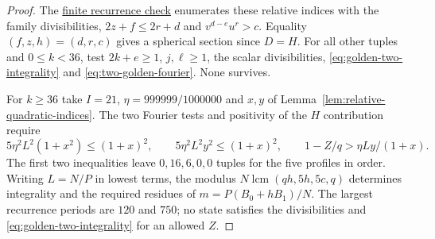 \documentclass[11pt,reqno]{amsart}
\newcommand{\codecheck}[2]{\href{https://github.com/sebastienpalcoux/grothendieck-ring-classification/blob/d5750105bb5758f3ad38d2e5464dfcc12c019816/supplements/rank6/sphericality/#1}{#2}}
\theoremstyle{remark}\newtheorem{remark}[theorem]{Remark}
\numberwithin{equation}{section}
\begin{document}
\begin{proof}
The \codecheck{golden_two_pairs_check.py}{finite recurrence check}
enumerates these relative indices with the family divisibilities,
$2z+f\le2r+d$ and $v^{d-e}u^r>c$. Equality
$(f,z,h)=(d,r,c)$ gives a spherical section since $D=H$.
For all other tuples and $0\le k<36$, test $2k+e\ge1$,
$j,\ell\ge1$, the scalar divisibilities,
\eqref{eq:golden-two-integrality} and \eqref{eq:two-golden-fourier}.
None survives.

For $k\ge36$ take $I=21$, $\eta=999999/1000000$ and $x,y$ of
Lemma~\ref{lem:relative-quadratic-indices}. The two Fourier tests
and positivity of the $H$ contribution require
\[
 5\eta^2 L^2(1+x^2)\le(1+x)^2,\qquad
 5\eta^2 L^2 y^2\le(1+x)^2,\qquad
 1-Z/q>\eta Ly/(1+x).
\]
The first two inequalities leave $0,16,6,0,0$ tuples for the five
profiles in order. Writing $L=N/P$ in lowest terms, the modulus
$N\operatorname{lcm}(qh,5h,5c,q)$ determines integrality and the
required residues of $m=P(B_0+hB_1)/N$. The largest recurrence
periods are $120$ and $750$; no state satisfies the divisibilities
and \eqref{eq:golden-two-integrality} for an allowed $Z$.
\end{proof}
\end{document}
